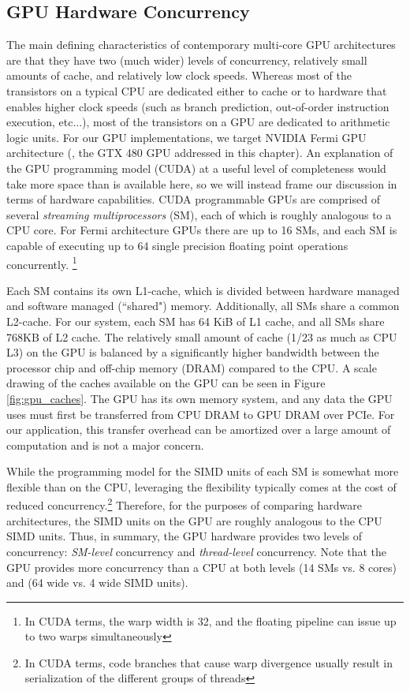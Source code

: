 \subsection{GPU Hardware Concurrency} 
The main defining characteristics of contemporary multi-core GPU architectures
are that they have two (much wider) levels of concurrency, relatively small amounts of
 cache, and relatively low clock speeds.  Whereas most of the transistors on
a typical CPU are dedicated either to cache or to hardware that enables higher
clock speeds (such as branch prediction, out-of-order instruction execution, etc...),
most of the transistors on a GPU are dedicated to arithmetic logic units.
For our GPU implementations, we target NVIDIA Fermi GPU architecture (\eg, the GTX 480
GPU addressed in this chapter).  An explanation of the GPU programming model (CUDA) at a useful level of completeness would take more space than is available here, so we will instead frame our discussion in terms of 
hardware capabilities. 
CUDA programmable GPUs are comprised of several
\emph{streaming multiprocessors} (SM), each of which is roughly analogous to a CPU core.
For Fermi architecture GPUs there are up to 16 SMs, and each SM is capable of executing up to 64 single precision 
floating point operations
concurrently. \footnote{In CUDA terms, the warp width is 32, and the floating pipeline can
issue up to two warps simultaneously}

Each SM contains its own L1-cache, which is divided between hardware managed
and software managed (``shared") memory.  Additionally, all SMs share a common
L2-cache.  For our system, each SM has 64 KiB of L1 cache, and all SMs share
768KB of L2 cache. 
The relatively small amount
of cache (1/23 as much as CPU L3) on the GPU is balanced by a significantly
higher bandwidth between the processor chip and off-chip memory (DRAM) compared
to the CPU.  A scale drawing of the caches available on the GPU can be seen in Figure \ref{fig:gpu_caches}.
The GPU has its own memory system, and any data the GPU uses must first be
transferred from CPU DRAM to GPU DRAM over PCIe.  For our application,
this transfer overhead can be amortized over a large amount of computation and is
not a major concern.

While the programming model for
the SIMD units of each SM is somewhat more flexible than on the CPU,
leveraging the flexibility typically comes at the cost of reduced concurrency.\footnote{
In CUDA terms, code branches that cause warp divergence usually
result in serialization of the different groups of threads}  Therefore, for
the purposes of comparing hardware architectures, the SIMD units on the GPU are
roughly analogous to the CPU SIMD units. Thus, in summary, the GPU hardware 
provides two levels of concurrency: {\em SM-level}
concurrency and {\em thread-level} concurrency.  Note that the GPU provides more
concurrency than a CPU at both levels (14 SMs vs. 8 cores) and (64 wide vs. 4 wide SIMD
units).


